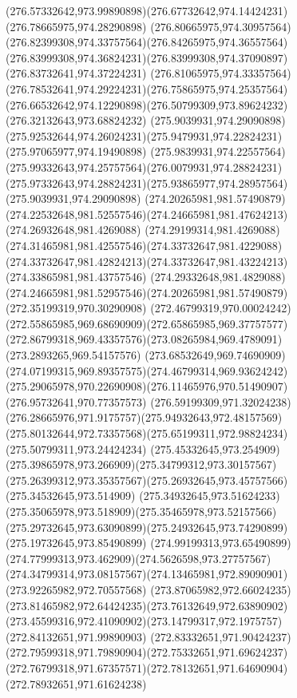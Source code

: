 {{	\curveto(276.57332642,973.99890898)(276.67732642,974.14424231)(276.78665975,974.28290898)
	\curveto(276.80665975,974.30957564)(276.82399308,974.33757564)(276.84265975,974.36557564)
	\curveto(276.83999308,974.36824231)(276.83999308,974.37090897)(276.83732641,974.37224231)
	\curveto(276.81065975,974.33357564)(276.78532641,974.29224231)(276.75865975,974.25357564)
	\curveto(276.66532642,974.12290898)(276.50799309,973.89624232)(276.32132643,973.68824232)
	\moveto(275.9039931,974.29090898)
	\curveto(275.92532644,974.26024231)(275.9479931,974.22824231)(275.97065977,974.19490898)
	\curveto(275.9839931,974.22557564)(275.99332643,974.25757564)(276.0079931,974.28824231)
	\curveto(275.97332643,974.28824231)(275.93865977,974.28957564)(275.9039931,974.29090898)
	\moveto(274.20265981,981.57490879)
	\curveto(274.22532648,981.52557546)(274.24665981,981.47624213)(274.26932648,981.4269088)
	\curveto(274.29199314,981.4269088)(274.31465981,981.42557546)(274.33732647,981.4229088)
	\curveto(274.33732647,981.42824213)(274.33732647,981.43224213)(274.33865981,981.43757546)
	\curveto(274.29332648,981.4829088)(274.24665981,981.52957546)(274.20265981,981.57490879)
	\moveto(272.35199319,970.30290908)
	\curveto(272.46799319,970.00024242)(272.55865985,969.68690909)(272.65865985,969.37757577)
	\curveto(272.86799318,969.43357576)(273.08265984,969.4789091)(273.2893265,969.54157576)
	\curveto(273.68532649,969.74690909)(274.07199315,969.89357575)(274.46799314,969.93624242)
	\curveto(275.29065978,970.22690908)(276.11465976,970.51490907)(276.95732641,970.77357573)
	\curveto(276.59199309,971.32024238)(276.28665976,971.9175757)(275.94932643,972.48157569)
	\curveto(275.80132644,972.73357568)(275.65199311,972.98824234)(275.50799311,973.24424234)
	\curveto(275.45332645,973.254909)(275.39865978,973.266909)(275.34799312,973.30157567)
	\curveto(275.26399312,973.35357567)(275.26932645,973.45757566)(275.34532645,973.514909)
	\curveto(275.34932645,973.51624233)(275.35065978,973.518909)(275.35465978,973.52157566)
	\curveto(275.29732645,973.63090899)(275.24932645,973.74290899)(275.19732645,973.85490899)
	\curveto(274.99199313,973.65490899)(274.77999313,973.462909)(274.5626598,973.27757567)
	\curveto(274.34799314,973.08157567)(274.13465981,972.89090901)(273.92265982,972.70557568)
	\curveto(273.87065982,972.66024235)(273.81465982,972.64424235)(273.76132649,972.63890902)
	\curveto(273.45599316,972.41090902)(273.14799317,972.1975757)(272.84132651,971.99890903)
	\curveto(272.83332651,971.90424237)(272.79599318,971.79890904)(272.75332651,971.69624237)
	\curveto(272.76799318,971.67357571)(272.78132651,971.64690904)(272.78932651,971.61624238)
}}
